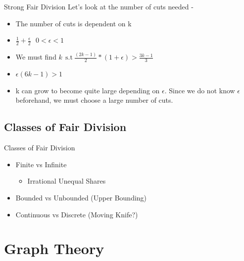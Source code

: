 \documentclass[aspectratio=169,xcolor=dvipsnames]{beamer}
\begin{document}
\begin{frame}{Strong Fair Division}
	Let's look at the number of cuts needed - 
	\begin{itemize}
		\item The number of cuts is dependent on k
		\item $\frac{1}{2} + \frac{\epsilon}{2}~~~0 < \epsilon < 1$
		\item We must find $k~~\text{s.t}~\frac{(2k-1)}{2}\ast (1+\epsilon) > \frac{3k-1}{3}$
		\item $\epsilon (6k-1) > 1 $
		\item k can grow to become quite large depending on $\epsilon$. Since we do not know $\epsilon$ beforehand, we must choose a large number of cuts.
	\end{itemize}
\end{frame} %
\subsection{Classes of Fair Division}
\begin{frame}{Classes of Fair Division}
	\begin{itemize}
		\item Finite vs Infinite 
		\begin{itemize}
			\item Irrational Unequal Shares
		\end{itemize}\pause
		\item Bounded vs Unbounded (Upper Bounding)\pause
		\item Continuous vs Discrete (Moving Knife?)
	\end{itemize}
\end{frame}
\section{Graph Theory}
\end{document}

